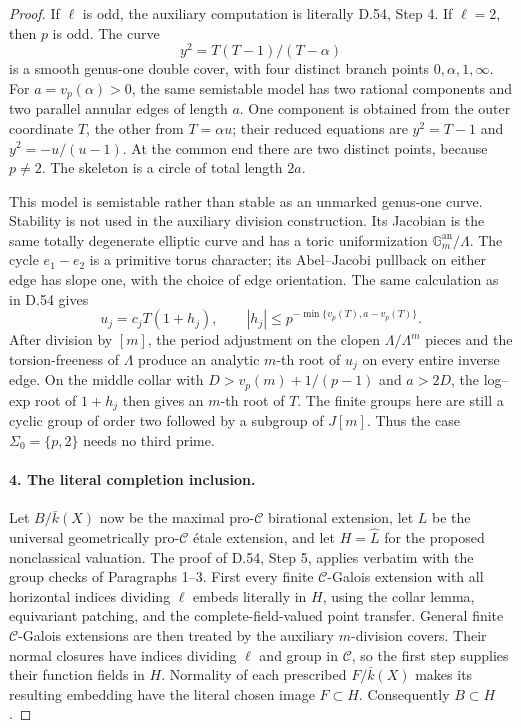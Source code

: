 \begin{proof}
If $\ell$ is odd, the auxiliary computation is literally D.54,
Step 4.  If $\ell=2$, then $p$ is odd.  The curve
\[
                    y^2=T(T-1)/(T-\alpha)
\]
is a smooth genus-one double cover, with four distinct branch
points $0,\alpha,1,\infty$.  For $a=v_p(\alpha)>0$, the same
semistable model has two rational components and two parallel
annular edges of length $a$.  One component is obtained from the
outer coordinate $T$, the other from $T=\alpha u$; their reduced
equations are $y^2=T-1$ and $y^2=-u/(u-1)$.  At the common end
there are two distinct points, because $p\ne2$.  The skeleton is
a circle of total length $2a$.

This model is semistable rather than stable as an unmarked
genus-one curve.  Stability is not used in the auxiliary division
construction.  Its Jacobian is the same totally degenerate
elliptic curve and has a toric uniformization
\cite[Sections 4.1--4.2 and 4.5.2]{DE_BakerRabinoff2015}
$\mathbb G_m^{\mathrm{an}}/\Lambda$.  The cycle $e_1-e_2$ is a
primitive torus character; its Abel--Jacobi pullback on either
edge has slope one, with the choice of edge orientation.  The
same calculation as in D.54 gives
\[
 u_j=c_jT(1+h_j),\qquad
 |h_j|\le p^{-\min\{v_p(T),a-v_p(T)\}}.
\]
After division by $[m]$, the period adjustment on the clopen
$\Lambda/\Lambda^m$ pieces and the torsion-freeness of $\Lambda$
produce an analytic $m$-th root of $u_j$ on every entire inverse
edge.  On the middle collar with
$D>v_p(m)+1/(p-1)$ and $a>2D$, the log--exp root of $1+h_j$
then gives an $m$-th root of $T$.  The finite groups here are
still a cyclic group of order two followed by a subgroup of
$J[m]$.  Thus the case $\Sigma_0=\{p,2\}$ needs no third prime.

\paragraph{4. The literal completion inclusion.}

Let $B/\bar k(X)$ now be the maximal pro-$\mathcal C$ birational
extension, let $L$ be the universal geometrically pro-$\mathcal C$
\'etale extension, and let $H=\widehat L$ for the proposed
nonclassical valuation.  The proof of D.54, Step 5, applies
verbatim with the group checks of Paragraphs 1--3.  First every
finite $\mathcal C$-Galois extension with all horizontal indices
dividing $\ell$ embeds literally in $H$, using the collar lemma,
equivariant patching, and the complete-field-valued point
transfer.  General finite $\mathcal C$-Galois extensions are then
treated by the auxiliary $m$-division covers.  Their normal
closures have indices dividing $\ell$ and group in $\mathcal C$,
so the first step supplies their function fields in $H$.
Normality of each prescribed $F/\bar k(X)$ makes its resulting
embedding have the literal chosen image $F\subset H$.
Consequently $B\subset H$.


\end{proof}
